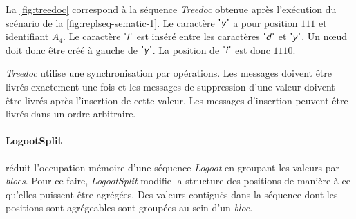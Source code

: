 \clearpage %

La \autoref{fig:treedoc} correspond à la séquence \emph{Treedoc} obtenue après l'exécution du scénario de la \autoref{fig:replseq-sematic-1}.
Le caractère $\textsf{'\textit{y}'}$ a pour position $111$ et identifiant $A_4$.
Le caractère $\textsf{'\textit{i}'}$ est inséré entre les caractères $\textsf{'\textit{d}'}$ et $\textsf{'\textit{y}'}$.
Un nœud doit donc être créé à gauche de $\textsf{'\textit{y}'}$.
La position de $\textsf{'\textit{i}'}$ est donc $1110$.

\emph{Treedoc} utilise une synchronisation par opérations.
Les messages doivent être livrés exactement une fois et les messages de suppression d'une valeur doivent être livrés après l'insertion de cette valeur.
Les messages d'insertion peuvent être livrés dans un ordre arbitraire.


\paragraph{LogootSplit}\autocite{andre_2013_logootsplit} réduit l'occupation mémoire d'une séquence \emph{Logoot} en groupant les valeurs par \emph{blocs}.
Pour ce faire, \emph{LogootSplit} modifie la structure des positions de manière à ce qu'elles puissent être agrégées.
Des valeurs contiguës dans la séquence dont les positions sont agrégeables sont groupées au sein d'un \emph{bloc}.

